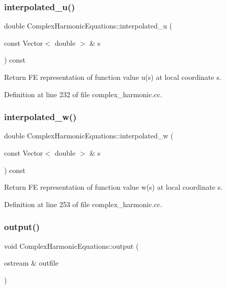\subsubsection{\texorpdfstring{interpolated\+\_\+u()}{interpolated\_u()}}
{\footnotesize\ttfamily double Complex\+Harmonic\+Equations\+::interpolated\+\_\+u (\begin{DoxyParamCaption}\item[{const Vector$<$ double $>$ \&}]{s }\end{DoxyParamCaption}) const\hspace{0.3cm}{\ttfamily [inline]}}



Return FE representation of function value u(s) at local coordinate s. 



Definition at line 232 of file complex\+\_\+harmonic.\+cc.

\mbox{\label{classComplexHarmonicEquations_a73b34acf2038ae9c2ef3f3e61d9c1cd7}} 
\subsubsection{\texorpdfstring{interpolated\+\_\+w()}{interpolated\_w()}}
{\footnotesize\ttfamily double Complex\+Harmonic\+Equations\+::interpolated\+\_\+w (\begin{DoxyParamCaption}\item[{const Vector$<$ double $>$ \&}]{s }\end{DoxyParamCaption}) const\hspace{0.3cm}{\ttfamily [inline]}}



Return FE representation of function value w(s) at local coordinate s. 



Definition at line 253 of file complex\+\_\+harmonic.\+cc.

\mbox{\label{classComplexHarmonicEquations_a9185e07b984e735c1c45b6f5a6c02b5f}} 
\subsubsection{\texorpdfstring{output()}{output()}\hspace{0.1cm}{\footnotesize\ttfamily [1/2]}}
{\footnotesize\ttfamily void Complex\+Harmonic\+Equations\+::output (\begin{DoxyParamCaption}\item[{ostream \&}]{outfile }\end{DoxyParamCaption})\hspace{0.3cm}{\ttfamily [inline]}}




